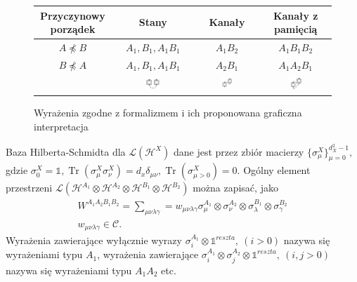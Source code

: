 \documentclass[10pt]{article} %
\DeclareMathOperator{\Trs}{Tr}
\newcommand{\Mats}[1]{\mathcal{L}(#1)}
\newcommand{\Hx}[1]{\mathcal{H}^{#1}}
\newcommand{\LHx}[1]{\Mats{\Hx{#1}}}
\newcommand{\Tr}[1]{\Trs(#1)}
\newcommand{\WAll}{W^{A_1A_2B_1B_2}}
\begin{document}
\begin{figure}[t]
\centering

\begin{tabular}{|c|c|c|c|}
\hline
Przyczynowy porządek & Stany & Kanały & Kanały z pamięcią \\
\hline
$A \npreceq B $ & $A_1, B_1, A_1B_1$ & $A_1B_2$ & $A_1B_1B_2$\\
\hline
$B \npreceq A $ & $A_1, B_1, A_1B_1$ & $A_2B_1$ & $A_1A_2B_1$\\ 
\hline
& \includegraphics[width=0.2\textwidth]{obrazki/states} & \includegraphics[width=0.2\textwidth]{obrazki/channel}& \includegraphics[width=0.2\textwidth]{obrazki/channel_with_memory}\\
\hline
\end{tabular}
\caption{Wyrażenia zgodne z formalizmem i ich proponowana graficzna interpretacja}
\label{fig:configs}
\end{figure}
Baza Hilberta-Schmidta dla $\LHx{X}$ dane jest przez zbiór macierzy $\{\sigma^X_\mu\}^{d^2_X-1}_{\mu=0},$ gdzie $\sigma^X_0 = \mathbb{1}, \Tr{\sigma^X_\mu\sigma^X_\nu}=d_x\delta_{\mu\nu}, \Tr{\sigma^X_{\mu>0}}=0.$ Ogólny element przestrzeni $\Mats{\Hx{A_1}\otimes\Hx{A_2}\otimes\Hx{B_1}\otimes\Hx{B_2}}$ można zapisać, jako
\begin{gather}
\WAll = \sum_{\mu\nu\lambda\gamma}= w_{\mu\nu\lambda\gamma} \sigma_\mu^{A_1}\otimes\sigma_\nu^{A_2}\otimes\sigma_\lambda^{B_1}\otimes\sigma_\gamma^{B_2} \\
w_{\mu\nu\lambda\gamma} \in \mathcal{C} \nonumber.
\end{gather}
Wyrażenia zawierające wyłącznie wyrazy $\sigma^{A_1}_i \otimes \mathbb{1}^{reszta},~(i > 0)$ nazywa się wyrażeniami typu $A_1$, wyrażenia zawierające  $\sigma^{A_1}_i \otimes \sigma^{A_2}_j \otimes \mathbb{1}^{reszta},~(i, j > 0)$ nazywa się wyrażeniami typu $A_1A_2$ etc.
\end{document}
